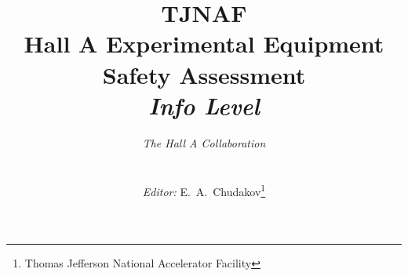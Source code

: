 \begin{titlepage}
\title{{\bf TJNAF \\ Hall A Experimental Equipment \\ 
     Safety Assessment \\[0.5cm]
    }{\normalsize {\sl Info Level \infolevel}}\\
}

\author{\centerline{{\it The Hall A Collaboration}}\\ 
    \centerline{\small {\it Editor:} E.~A.~Chudakov\thanks{Thomas Jefferson National Accelerator Facility}}
}
    
\setcounter{tocdepth}{3}
\end{titlepage} 
\maketitle 
 
%
